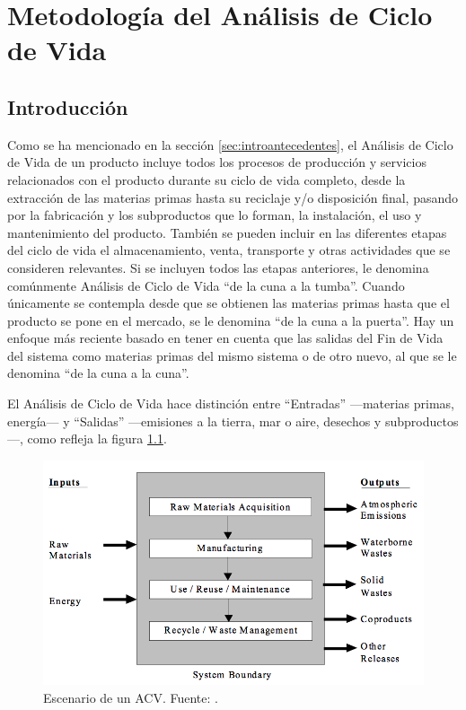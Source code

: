 \chapter{Metodología del Análisis de Ciclo de Vida}\label{cap:metodologia_acv}
\section{Introducción}

Como se ha mencionado en la sección \ref{sec:introantecedentes}, el Análisis de Ciclo de Vida de un producto incluye todos los procesos de producción y servicios relacionados con el producto durante su ciclo de vida completo, desde la extracción de las materias primas hasta su reciclaje y/o disposición final, pasando por la fabricación y los subproductos que lo forman, la instalación, el uso y mantenimiento del producto. También se pueden incluir en las diferentes etapas del ciclo de vida el almacenamiento, venta, transporte y otras actividades que se consideren relevantes. Si se incluyen todos las etapas anteriores, le denomina comúnmente Análisis de Ciclo de Vida ``de la cuna a la tumba''. Cuando únicamente se contempla desde que se obtienen las materias primas hasta que el producto se pone en el mercado, se le denomina ``de la cuna a la puerta''. Hay un enfoque más reciente basado en tener en cuenta que las salidas del Fin de Vida del sistema como materias primas del mismo sistema o de otro nuevo, al que se le denomina ``de la cuna a la cuna''.


El Análisis de Ciclo de Vida hace distinción entre ``Entradas'' —materias primas, energía— y ``Salidas'' —emisiones a la tierra, mar o aire, desechos y subproductos—, como refleja la figura \ref{fig:escenariolca}.

\begin{figure}[!htb]
\centering
\includegraphics[width=12cm]{img/escenariolca.png}
\caption[Escenario de un ACV]{Escenario de un ACV. Fuente: \protect\cite{epa}.}
\label{fig:escenariolca}
\end{figure}

